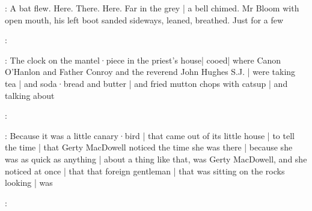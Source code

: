 :
A bat flew.
Here.
There.
Here.
Far in the grey |
a bell chimed.
Mr Bloom with open mouth,
his left boot sanded sideways,
leaned,
breathed.
Just for a few

:

:
The clock on the mantel·piece in the priest's house| 
cooed| 
where Canon O'Hanlon
and Father Conroy
and the reverend John Hughes S.J. | 
were taking tea |
and soda·bread and butter |
and fried mutton chops with catsup |
and talking about

:

:
Because it was a little canary·bird |
that came out of its little house |
to tell the time |
that Gerty MacDowell noticed the time she was there |%
because she was as quick as anything |
about a thing like that,
was Gerty MacDowell,
and she noticed at once |
that that foreign gentleman |
that was sitting on the rocks looking |
was

:
